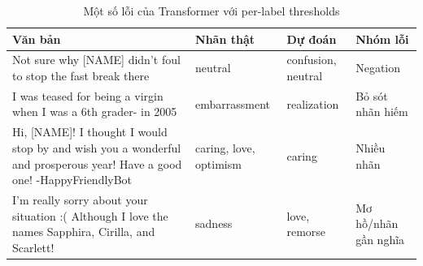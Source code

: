 \begin{table}[H]
\centering
\footnotesize
\begin{tabular}{p{5.2cm}p{3.0cm}p{3.0cm}p{2.2cm}}
\toprule
\textbf{Văn bản} & \textbf{Nhãn thật} & \textbf{Dự đoán} & \textbf{Nhóm lỗi} \\
\midrule
Not sure why [NAME] didn't foul to stop the fast break there & neutral & confusion, neutral & Negation \\
I was teased for being a virgin when I was a 6th grader- in 2005 & embarrassment & realization & Bỏ sót nhãn hiếm \\
Hi, [NAME]! I thought I would stop by and wish you a wonderful and prosperous year! Have a good one! -HappyFriendlyBot & caring, love, optimism & caring & Nhiều nhãn \\
I’m really sorry about your situation :( Although I love the names Sapphira, Cirilla, and Scarlett! & sadness & love, remorse & Mơ hồ/nhãn gần nghĩa \\
\bottomrule
\end{tabular}
\caption{Một số lỗi của Transformer với per-label thresholds}
\label{tab:error-examples}
\end{table}
